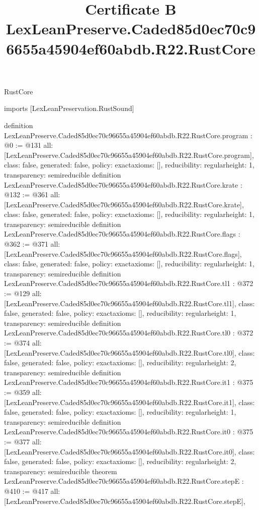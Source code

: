 \begin{lexlean}{RustCore}
\title{Certificate B LexLeanPreserve.Caded85d0ec70c96655a45904ef60abdb.R22.RustCore}
\begin{coremodule}
imports [LexLeanPreservation.RustSound]

definition LexLeanPreserve.Caded85d0ec70c96655a45904ef60abdb.R22.RustCore.program : @0 := @131 {
  all: [LexLeanPreserve.Caded85d0ec70c96655a45904ef60abdb.R22.RustCore.program],
  class: false,
  generated: false,
  policy: exact{axioms: []},
  reducibility: regular{height: 1},
  transparency: semireducible
}
definition LexLeanPreserve.Caded85d0ec70c96655a45904ef60abdb.R22.RustCore.krate : @132 := @361 {
  all: [LexLeanPreserve.Caded85d0ec70c96655a45904ef60abdb.R22.RustCore.krate],
  class: false,
  generated: false,
  policy: exact{axioms: []},
  reducibility: regular{height: 1},
  transparency: semireducible
}
definition LexLeanPreserve.Caded85d0ec70c96655a45904ef60abdb.R22.RustCore.flags : @362 := @371 {
  all: [LexLeanPreserve.Caded85d0ec70c96655a45904ef60abdb.R22.RustCore.flags],
  class: false,
  generated: false,
  policy: exact{axioms: []},
  reducibility: regular{height: 1},
  transparency: semireducible
}
definition LexLeanPreserve.Caded85d0ec70c96655a45904ef60abdb.R22.RustCore.tl1 : @372 := @129 {
  all: [LexLeanPreserve.Caded85d0ec70c96655a45904ef60abdb.R22.RustCore.tl1],
  class: false,
  generated: false,
  policy: exact{axioms: []},
  reducibility: regular{height: 1},
  transparency: semireducible
}
definition LexLeanPreserve.Caded85d0ec70c96655a45904ef60abdb.R22.RustCore.tl0 : @372 := @374 {
  all: [LexLeanPreserve.Caded85d0ec70c96655a45904ef60abdb.R22.RustCore.tl0],
  class: false,
  generated: false,
  policy: exact{axioms: []},
  reducibility: regular{height: 2},
  transparency: semireducible
}
definition LexLeanPreserve.Caded85d0ec70c96655a45904ef60abdb.R22.RustCore.it1 : @375 := @359 {
  all: [LexLeanPreserve.Caded85d0ec70c96655a45904ef60abdb.R22.RustCore.it1],
  class: false,
  generated: false,
  policy: exact{axioms: []},
  reducibility: regular{height: 1},
  transparency: semireducible
}
definition LexLeanPreserve.Caded85d0ec70c96655a45904ef60abdb.R22.RustCore.it0 : @375 := @377 {
  all: [LexLeanPreserve.Caded85d0ec70c96655a45904ef60abdb.R22.RustCore.it0],
  class: false,
  generated: false,
  policy: exact{axioms: []},
  reducibility: regular{height: 2},
  transparency: semireducible
}
theorem LexLeanPreserve.Caded85d0ec70c96655a45904ef60abdb.R22.RustCore.stepE : @410 := @417 {
  all: [LexLeanPreserve.Caded85d0ec70c96655a45904ef60abdb.R22.RustCore.stepE],
}
\end{coremodule}
\end{lexlean}
